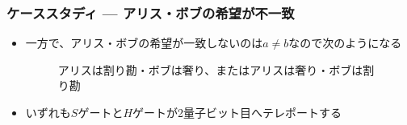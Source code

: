 \begin{frame}
  \frametitle{ケーススタディ --- アリス・ボブの希望が不一致}

  \begin{itemize}
    \item 一方で、アリス・ボブの希望が一致しないのは$a \ne b$なので次のようになる
    \begin{figure}
      \caption{アリスは割り勘・ボブは奢り、またはアリスは奢り・ボブは割り勘}
      \label{fig:a_eq_1_b_eq_0}
    \end{figure}
  
    \item いずれも$S$ゲートと$H$ゲートが2量子ビット目へテレポートする
  \end{itemize}

\end{frame}

